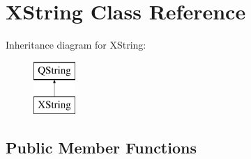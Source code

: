 \hypertarget{class_x_string}{}\section{X\+String Class Reference}
\label{class_x_string}
Inheritance diagram for X\+String\+:\begin{figure}[H]
\begin{center}
\leavevmode
\includegraphics[height=2.000000cm]{class_x_string}
\end{center}
\end{figure}
\subsection*{Public Member Functions}

